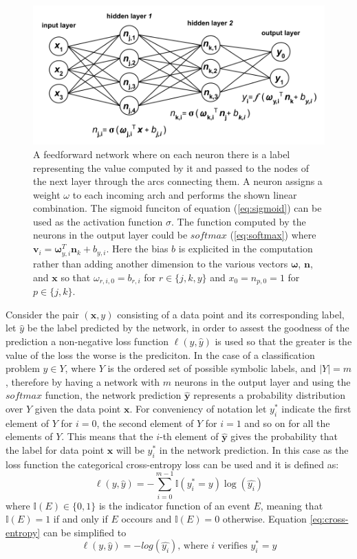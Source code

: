 \documentclass[12pt]{article}
\newcommand{\vect}[1]{\boldsymbol{#1}}
\begin{document}
\begin{figure}[h]
    \centering
    \includegraphics[width=\textwidth]{mlp}
    \caption{A feedforward network where on each neuron there is a label representing the value computed by it and passed to the nodes of the next layer through the arcs connecting them. A neuron assigns a weight $ \omega $ to each incoming arch and performs the shown linear combination. The sigmoid funciton of equation (\ref{eq:sigmoid}) can be used as the activation function $\sigma$. The function computed by the neurons in the output layer could be $softmax$ (\ref{eq:softmax}) where $\vect{v}_i = \vect{\omega}_{y,i}^T\vect{n}_k + b_{y,i}$. Here the bias $ b $ is explicited in the computation rather than adding another dimension to the various vectors $ \vect{\omega} $, $ \vect{n}$, and $ \vect{x} $ so that $ \omega_{r,i,0} = b_{r,i} $ for $ r \in \{j,k,y\} $ and $ x_{0} = n_{p,0} = 1 $ for $p \in \{j,k\} $.}
\label{fig:mlp}
\end{figure}

Consider the pair $(\vect{x}, y)$ consisting of a data point and its corresponding label, let $\hat{{y}}$ be the label predicted by the network, in order to assest the goodness of the prediction a non-negative loss function $\ell(y,\hat{y})$ is used so that the greater is the value of the loss the worse is the prediciton. In the case of a classification problem $y \in Y$, where $Y$ is the ordered set of possible symbolic labels, and $|Y| = m$, therefore by having a network with $m$ neurons in the output layer and using the $softmax$ function, the network prediction $\vect{\hat{y}}$ represents a probability distribution over $Y$ given the data point $\vect{x}$. For conveniency of notation let $y^*_i$ indicate the first element of $Y$ for $i = 0$, the second element of $Y$ for $i = 1$ and so on for all the elements of $Y$. This means that the $i$-th element of $\vect{\hat{y}}$ gives the probability that the label for data point $\vect{x}$ will be $y^*_i$ in the network prediction. In this case as the loss function the categorical cross-entropy loss can be used and it is defined as:
\begin{equation}
\label{eq:cross-entropy}
\ell(y,\hat{y}) = -\sum_{i=0}^{m-1}{\mathbb{I}(y^*_i = y)\log(\hat{y_i})} 
\end{equation}
where $\mathbb{I}(E) \in \{0, 1\}$ is the indicator function of an event $E$, meaning that $\mathbb{I}(E) = 1$ if and only if $E$ occours and $\mathbb{I}(E) = 0$ otherwise. Equation \ref{eq:cross-entropy} can be simplified to
$$
\ell(y, \hat{y}) = -log(\hat{y_i}) \text{, where } i \text{ verifies } y^*_i = y
$$
\end{document}
